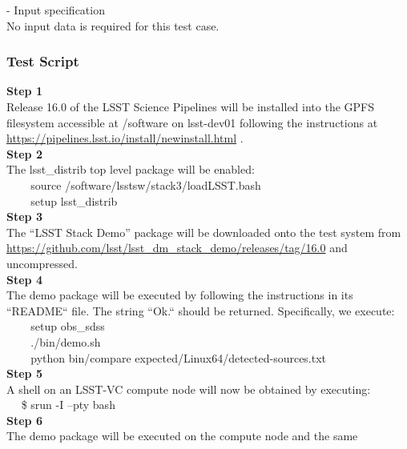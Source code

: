 - Input specification\\[2\baselineskip]No input data is required for
this test case.

\subsubsection{Test Script}\label{test-script}

\textbf{Step 1}\\
Release 16.0 of the LSST Science Pipelines will be installed into the
GPFS filesystem accessible at /software on lsst-dev01 following the
instructions at \url{https://pipelines.lsst.io/install/newinstall.html}
.\\[2\baselineskip]\textbf{Step 2}\\
The lsst\_distrib top level package will be
enabled:\\[2\baselineskip]\hspace*{0.333em} ~ ~ ~source
/software/lsstsw/stack3/loadLSST.bash\\
\hspace*{0.333em} ~ ~ ~setup lsst\_distrib\\[2\baselineskip]\textbf{Step
3}\\
The ``LSST Stack Demo'' package will be downloaded onto the test system
from
\href{https://github.com/lsst/lsst_dm_stack_demo/releases/tag/14.0}{https://github.com/lsst/lsst\_dm\_stack\_demo/releases/tag/16.0}
and uncompressed.\\[2\baselineskip]\textbf{Step 4}\\
The demo package will be executed by following the instructions in its
``README`` file. The string ``Ok.`` should be returned. Specifically, we
execute:\\
\hspace*{0.333em} ~ ~ ~setup obs\_sdss\\
\hspace*{0.333em} ~ ~ ~./bin/demo.sh\\
\hspace*{0.333em} ~ ~ ~python bin/compare
expected/Linux64/detected-sources.txt\\[2\baselineskip]\textbf{Step 5}\\
A shell on an LSST-VC compute node will now be obtained by executing:\\
\hspace*{0.333em} ~ ~\$ srun -I --pty bash\\[2\baselineskip]\textbf{Step
6}\\
The demo package will be executed on the compute node and the same
